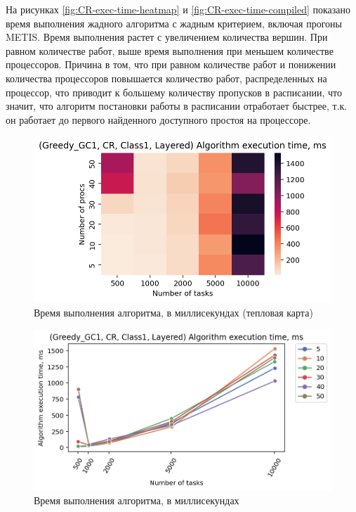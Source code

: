 На рисунках \ref{fig:CR-exec-time-heatmap} и \ref{fig:CR-exec-time-compiled} показано время выполнения жадного алгоритма с жадным критерием, включая прогоны METIS. Время выполнения растет с увеличением количества вершин. При равном количестве работ, выше время выполнения при меньшем количестве процессоров. Причина в том, что при равном количестве работ и понижении количества процессоров повышается количество работ, распределенных на процессор, что приводит к большему количеству пропусков в расписании, что значит, что алгоритм постановки работы в расписании отработает быстрее, т.к. он работает до первого найденного доступного простоя на процессоре. 

\begin{figure}[!htbp]
    \centering
    \includegraphics[width=\textwidth]{imgs/layered_class_1/CR/et_heatmap.png}
    \caption{Время выполнения алгоритма, в миллисекундах (тепловая карта)}
    \label{fig:CR-layered-exec-time-heatmap}
\end{figure}

\begin{figure}[!htbp]
    \centering
    \includegraphics[width=\textwidth]{imgs/layered_class_1/CR/tr_graph.png}
    \caption{Время выполнения алгоритма, в миллисекундах}
    \label{fig:CR-layered-exec-time-compiled}
\end{figure}

